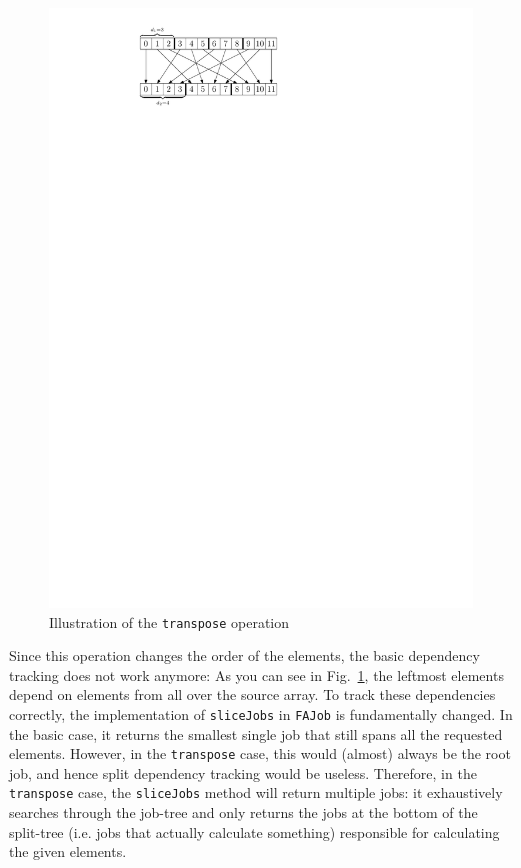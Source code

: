 \documentclass[runningheads,a4paper,fleqn]{llncs}
\begin{document}
\begin{figure}
\centering
\includegraphics{transpose}
\caption{Illustration of the \texttt{transpose} operation}
\label{fig:transpose}
\end{figure}

Since this operation changes the order of the elements, the basic
dependency tracking does not work anymore: As you can see in
Fig.~\ref{fig:transpose}, the leftmost elements depend on elements from
all over the source array. To track these dependencies correctly, the
implementation of \texttt{sliceJobs} in \texttt{FAJob} is fundamentally
changed. In the 
basic case, it returns the smallest single job that still spans all
the requested elements. However, in the \texttt{transpose} case, this
would (almost)
always be the root job, and hence split dependency tracking would
be useless. Therefore,
in the \texttt{transpose} case, the \texttt{sliceJobs} method will
return multiple jobs: it exhaustively searches through the job-tree
and only returns the jobs at the bottom of the split-tree (i.e. jobs
that actually calculate something) responsible for calculating the
given elements.
\end{document}
